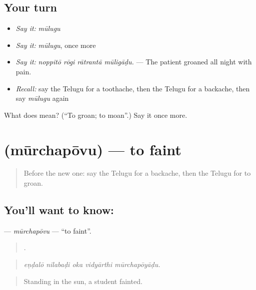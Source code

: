 \subsection*{Your turn}
\begin{itemize}
\raggedright
  \item \emph{Say it:} \emph{mūlugu}
  \item \emph{Say it:} \emph{mūlugu}, once more
  \item \emph{Say it:} \emph{noppitō rōgi rātrantā mūligāḍu.} — The patient groaned all night with pain.
  \item \emph{Recall:} say the Telugu for a toothache, then the Telugu for a backache, then say \emph{mūlugu} again
\end{itemize}

\begin{tcolorbox}[breakable,colback=teal!4,colframe=teal!35!black,title={Before you move on}]
What does  mean? (\textquotedblleft{}To groan; to moan\textquotedblright{}.) Say it once more.
\end{tcolorbox}
\section[\texorpdfstring{\te{మూర్ఛపోవు} (mūrchapōvu)}{మూర్ఛపోవు (mūrchapōvu)}]{ (mūrchapōvu) — to faint}

\label{lesson:TE-C514-murchapovu}



\begin{quote}
Before the new one: say the Telugu for a backache, then the Telugu for to groan.
\end{quote}

\subsection*{You'll want to know: }
\textbf{} — \emph{mūrchapōvu} — \textquotedblleft{}to faint\textquotedblright{}.

\begin{quote}
    .
\end{quote}

\begin{quote}
\emph{eṇḍalō nilabaḍi oka vidyārthi mūrchapōyāḍu.}
\end{quote}

\begin{quote}
Standing in the sun, a student fainted.
\end{quote}

